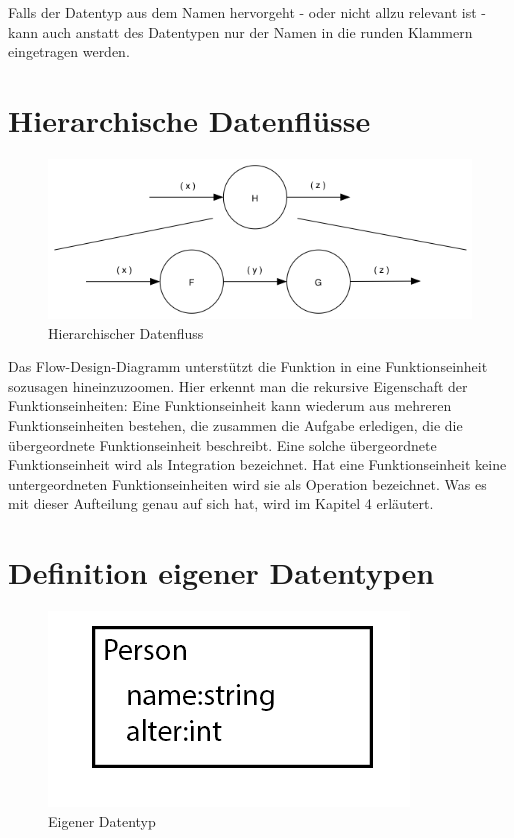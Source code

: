Falls der Datentyp aus dem Namen hervorgeht - oder nicht allzu relevant ist - kann auch anstatt des Datentypen nur der Namen in die runden Klammern eingetragen werden.


\clearpage

\section{Hierarchische Datenflüsse}



\begin{figure}[H]
	\centering
	\includegraphics[width=1\linewidth]{./img/diagramHir.png}
	\caption{Hierarchischer Datenfluss}
\end{figure}


Das Flow-Design-Diagramm unterstützt die Funktion in eine Funktionseinheit sozusagen hineinzuzoomen.
Hier erkennt man die rekursive Eigenschaft der Funktionseinheiten:
Eine Funktionseinheit kann wiederum aus mehreren Funktionseinheiten bestehen,
die zusammen die Aufgabe erledigen, die die übergeordnete Funktionseinheit
beschreibt. Eine solche übergeordnete Funktionseinheit wird als Integration
bezeichnet. Hat eine Funktionseinheit keine untergeordneten Funktionseinheiten wird sie
als Operation bezeichnet. Was es mit dieser Aufteilung genau auf sich hat, wird im Kapitel 4 erläutert.


\section{Definition eigener Datentypen}






\begin{figure}[H]
	\centering
	\includegraphics[width=.35\linewidth]{./img/diagramCustomTypes.png}
	\caption{Eigener Datentyp}
\end{figure}


